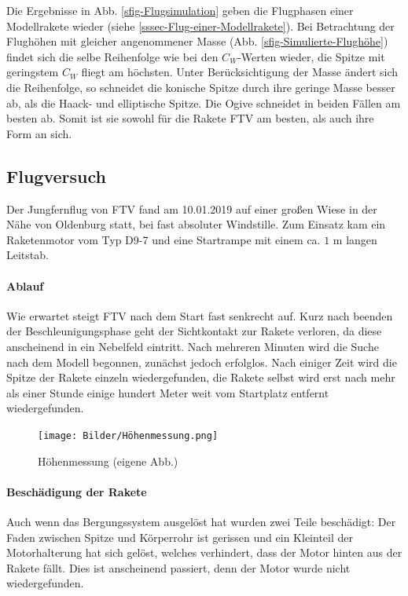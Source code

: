 \documentclass[10pt,a4paper]{article}
\begin{document}
\noindent
Die Ergebnisse in Abb. \ref{sfig-Flugsimulation} geben die Flugphasen einer Modellrakete wieder (siehe \ref{sssec-Flug-einer-Modellrakete}). Bei Betrachtung der Flughöhen mit gleicher angenommener Masse (Abb. \ref{sfig-Simulierte-Flughöhe}) findet sich die selbe Reihenfolge wie bei den $C_{W}$-Werten wieder, die Spitze mit geringstem $C_{W}$ fliegt am höchsten. Unter Berücksichtigung der Masse ändert sich die Reihenfolge, so schneidet die konische Spitze durch ihre geringe Masse besser ab, als die Haack- und elliptische Spitze. Die Ogive schneidet in beiden Fällen am besten ab. Somit ist sie sowohl für die Rakete FTV am besten, als auch ihre Form an sich. 


\subsection{Flugversuch}\label{ssec-Flugversuch-Luftwiderstand}

Der Jungfernflug von FTV fand am 10.01.2019 auf einer großen Wiese in der Nähe von Oldenburg statt, bei fast absoluter Windstille. Zum Einsatz kam ein Raketenmotor vom Typ \textsf{D9-7} und eine Startrampe mit einem ca. $1 \text{ m}$ langen Leitstab.

\paragraph{Ablauf}
Wie erwartet steigt FTV nach dem Start fast senkrecht auf. Kurz nach beenden der Beschleunigungsphase geht der Sichtkontakt zur Rakete verloren, da diese anscheinend in ein Nebelfeld eintritt. Nach mehreren Minuten wird die Suche nach dem Modell begonnen, zunächst jedoch erfolglos. Nach einiger Zeit wird die Spitze der Rakete einzeln wiedergefunden, die Rakete selbst wird erst nach mehr als einer Stunde einige hundert Meter weit vom Startplatz entfernt wiedergefunden. 

\begin{figure}
	\vspace{-10pt}
	\texttt{[image: Bilder/Höhenmessung.png]}
	\caption{Höhenmessung (eigene Abb.)}
	\vspace{-10pt}
\end{figure}

\paragraph{Beschädigung der Rakete}
Auch wenn das Bergungssystem ausgelöst hat wurden zwei Teile beschädigt: Der Faden zwischen Spitze und Körperrohr ist gerissen und ein Kleinteil der Motorhalterung hat sich gelöst, welches verhindert, dass der Motor hinten aus der Rakete fällt. Dies ist anscheinend passiert, denn der Motor wurde nicht wiedergefunden. 
\end{document}
